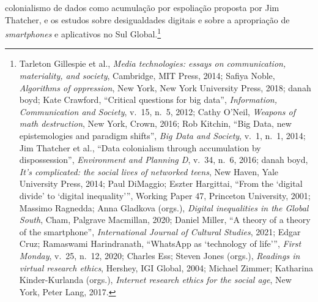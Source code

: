 colonialismo de dados como acumulação por espoliação proposta por Jim Thatcher, e os estudos sobre desigualdades digitais e sobre a apropriação de \textit{smartphones} e aplicativos no Sul Global.\footnote{Tarleton Gillespie et al., \textit{Media technologies: essays on communication, materiality, and society}, Cambridge, MIT Press, 2014; Safiya Noble, \textit{Algorithms of oppression}, New York, New York University Press, 2018; danah boyd; Kate Crawford, \enquote{Critical questions for big data}, \textit{Information, Communication and Society}, v.~15, n.~5, 2012; Cathy O'Neil, \textit{Weapons of math destruction}, New York, Crown, 2016; Rob Kitchin, \enquote{Big Data, new epistemologies and paradigm shifts}, \textit{Big Data and Society}, v.~1, n.~1, 2014; Jim Thatcher et al., \enquote{Data colonialism through accumulation by dispossession}, \textit{Environment and Planning D}, v.~34, n.~6, 2016; danah boyd, \textit{It's complicated: the social lives of networked teens}, New Haven, Yale University Press, 2014; Paul DiMaggio; Eszter Hargittai, \enquote{From the \enquote{digital divide} to \enquote{digital inequality}}, Working Paper 47, Princeton University, 2001; Massimo Ragnedda; Anna Gladkova (orgs.), \textit{Digital inequalities in the Global South}, Cham, Palgrave Macmillan, 2020; Daniel Miller, \enquote{A theory of a theory of the smartphone}, \textit{International Journal of Cultural Studies}, 2021; Edgar Cruz; Ramaswami Harindranath, \enquote{WhatsApp as \enquote{technology of life}}, \textit{First Monday}, v.~25, n.~12, 2020; Charles Ess; Steven Jones (orgs.), \textit{Readings in virtual research ethics}, Hershey, IGI Global, 2004; Michael Zimmer; Katharina Kinder-Kurlanda (orgs.), \textit{Internet research ethics for the social age}, New York, Peter Lang, 2017.}
